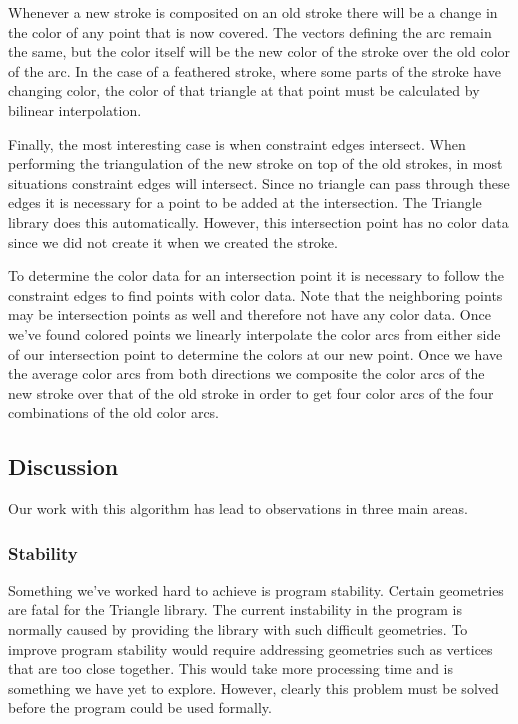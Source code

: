 \documentclass[conference]{acmsiggraph}
\begin{document}
Whenever a new stroke is composited on an old stroke there will be a change in the color of
any point that is now covered. The vectors defining the arc remain the same, but the color
itself will be the new color of the stroke over the old color of the arc. In the case of a
feathered stroke, where some parts of the stroke have changing color, the color of that
triangle at that point must be calculated by bilinear interpolation.

Finally, the most interesting case is when constraint edges intersect. When performing the 
triangulation of the new stroke on top of the old strokes, in most situations constraint
edges will intersect. Since no triangle can pass through these edges it is necessary for a point
to be added at the intersection. The Triangle library does this automatically. However, this
intersection point has no color data since we did not create it when we created the
stroke.

To determine the color data for an intersection point it is necessary to follow the constraint
edges to find points with color data. Note that the neighboring points may be intersection
points as well and therefore not have any color data. Once we've found colored points we
linearly interpolate the color arcs from either side of our intersection point to determine 
the colors at our new point. Once we have the average color arcs from both directions we
composite the color arcs of the new stroke over that of the old stroke in order to get four
color arcs of the four combinations of the old color arcs.

\subsection{Discussion}
Our work with this algorithm has lead to observations in three main areas.

\subsubsection{Stability}
Something we've worked hard to achieve is program stability. Certain geometries are fatal
for the Triangle library. The current instability in the program is normally caused by
providing the library with such difficult geometries. To improve program stability would
require addressing geometries such as vertices that are too close together. This would
take more processing time and is something we have yet to explore. However, clearly this
problem must be solved before the program could be used formally.
\end{document}
